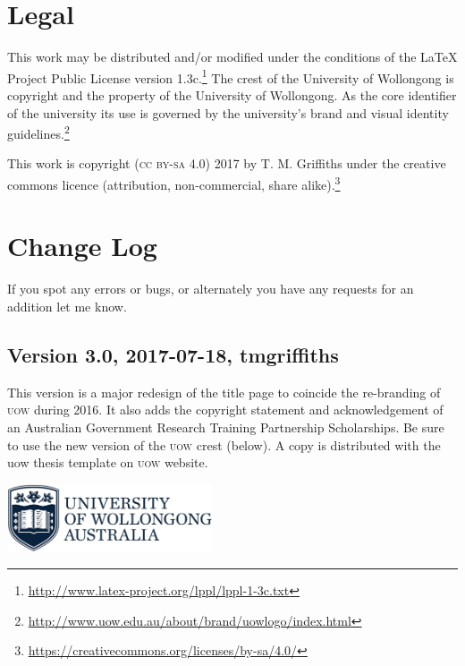 \documentclass[12pt,oneside]{article}
\begin{document}
\section{Legal}
This work may be distributed and/or modified under the conditions of the \LaTeX{} Project Public License version 1.3c.\footnote{\url{http://www.latex-project.org/lppl/lppl-1-3c.txt}} The crest of the University of Wollongong is copyright and the property of the University of Wollongong. As the core identifier of the university its use is governed by the university's brand and visual identity guidelines.\footnote{\url{http://www.uow.edu.au/about/brand/uowlogo/index.html}}

This work is copyright (\textsc{cc by-sa 4.0}) 2017 by T. M. Griffiths under the creative commons licence (attribution, non-commercial, share alike).\footnote{\url{https://creativecommons.org/licenses/by-sa/4.0/}}

\begin{center}\color{UOWdarkblue}\ccbysa\end{center}

\clearpage

\section{Change Log}
If you spot any errors or bugs, or alternately you have any requests for an addition let me know.

\subsection*{Version 3.0, 2017-07-18, tmgriffiths}
This version is a major redesign of the title page to coincide the re-branding of \textsc{uow} during 2016. It also adds the copyright statement and acknowledgement of an Australian Government Research Training Partnership Scholarships. Be sure to use the new version of the \textsc{uow} crest (below). A copy is distributed with the uow thesis template on \textsc{uow} website.
\begin{center}
  \includegraphics[height=20mm]{uow_logo.png}
\end{center}
\end{document}
